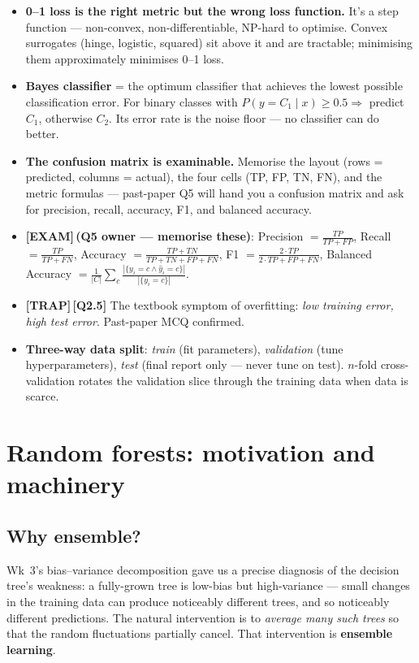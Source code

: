 \documentclass[11pt, a4paper]{article}
\newcommand{\examflag}{\textcolor{tipBd}{\textbf{[EXAM]}}\,}
\newcommand{\trapflag}{\textcolor{trapBd}{\textbf{[TRAP]}}\,}
\begin{document}
\begin{tldrbox}
\begin{itemize}[leftmargin=*]
  \item \textbf{0--1 loss is the right metric but the wrong loss function.} It's a step function — non-convex, non-differentiable, NP-hard to optimise. Convex surrogates (hinge, logistic, squared) sit above it and are tractable; minimising them approximately minimises 0--1 loss.
  \item \textbf{Bayes classifier} = the optimum classifier that achieves the lowest possible classification error. For binary classes with $P(y = C_1 \mid x) \ge 0.5 \Rightarrow$ predict $C_1$, otherwise $C_2$. Its error rate is the noise floor — no classifier can do better.
  \item \textbf{The confusion matrix is examinable.} Memorise the layout (rows = predicted, columns = actual), the four cells (TP, FP, TN, FN), and the metric formulas — past-paper Q5 will hand you a confusion matrix and ask for precision, recall, accuracy, F1, and balanced accuracy.
  \item \examflag{}\textbf{(Q5 owner — memorise these)}: Precision $= \tfrac{TP}{TP+FP}$, Recall $= \tfrac{TP}{TP+FN}$, Accuracy $= \tfrac{TP+TN}{TP+TN+FP+FN}$, F1 $= \tfrac{2 \cdot TP}{2\cdot TP + FP + FN}$, Balanced Accuracy $= \tfrac{1}{|C|}\sum_c \tfrac{|\{y_i = c \wedge \hat y_i = c\}|}{|\{y_i = c\}|}$.
  \item \trapflag{}\textbf{[Q2.5]} The textbook symptom of overfitting: \emph{low training error, high test error}. Past-paper MCQ confirmed.
  \item \textbf{Three-way data split}: \emph{train} (fit parameters), \emph{validation} (tune hyperparameters), \emph{test} (final report only — never tune on test). $n$-fold cross-validation rotates the validation slice through the training data when data is scarce.
\end{itemize}
\end{tldrbox}

\section{Random forests: motivation and machinery}

\subsection{Why ensemble?}

Wk~3's bias--variance decomposition gave us a precise diagnosis of the decision tree's weakness: a fully-grown tree is low-bias but high-variance — small changes in the training data can produce noticeably different trees, and so noticeably different predictions. The natural intervention is to \emph{average many such trees} so that the random fluctuations partially cancel. That intervention is \textbf{ensemble learning}.
\end{document}
